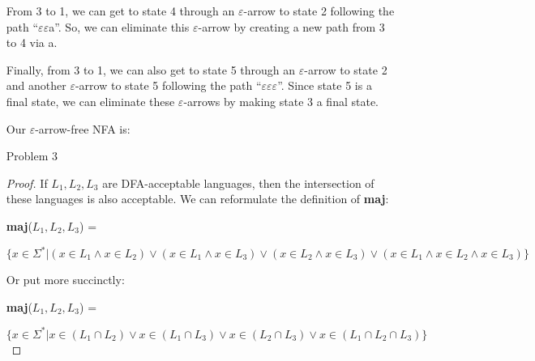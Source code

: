 \documentclass[12pt,letterpaper]{article}
\begin{document}
\begin{enumerate}
      From 3 to 1, we can get to state 4 through an $\varepsilon$-arrow to state 2 following the path ``$\varepsilon\varepsilon$a''.
      So, we can eliminate this $\varepsilon$-arrow by creating a new path from 3 to 4 via a.

      Finally, from 3 to 1, we can also get to state 5 through an $\varepsilon$-arrow to state 2 and another $\varepsilon$-arrow to state 5 following the path ``$\varepsilon\varepsilon\varepsilon$''.
      Since state 5 is a final state, we can eliminate these $\varepsilon$-arrows by making state 3 a final state.

      Our $\varepsilon$-arrow-free NFA is:


    \item[Problem 3]
      \begin{proof}
        If $L_1,L_2,L_3$ are DFA-acceptable languages, then the intersection of these languages is also acceptable.
        We can reformulate the definition of \textbf{maj}:

        \textbf{maj}($L_1,L_2,L_3$) =

        $\{x \in \Sigma^* | (x \in L_1 \land x \in L_2) \lor (x \in L_1 \land x \in L_3) \lor (x \in L_2 \land x \in L_3) \lor (x \in L_1 \land x \in L_2 \land x \in L_3)\}$

        Or put more succinctly:

        \textbf{maj}($L_1,L_2,L_3$) =

        $\{x \in \Sigma^* | x \in (L_1 \cap L_2) \lor x \in (L_1 \cap L_3) \lor x \in (L_2 \cap L_3) \lor x \in (L_1 \cap L_2 \cap L_3)\}$


\end{proof}
\end{enumerate}
\end{document}
